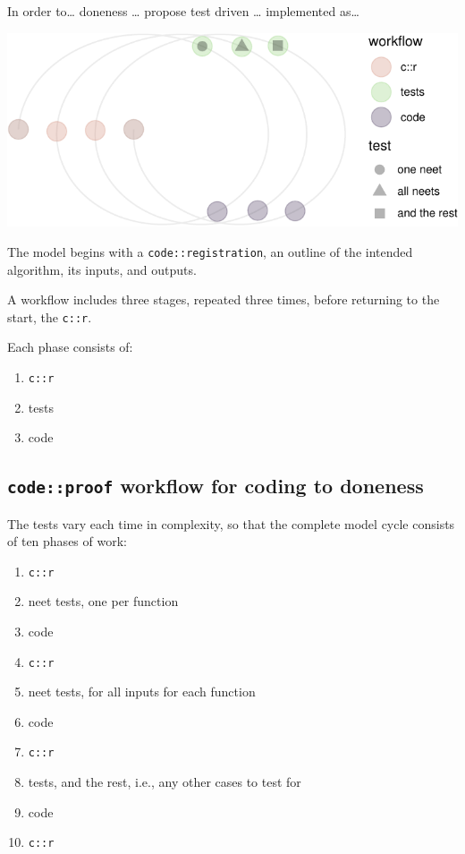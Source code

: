 \documentclass[
]{article}
\providecommand{\tightlist}{%
  \setlength{\itemsep}{0pt}\setlength{\parskip}{0pt}}
\begin{document}
In order to\ldots{} doneness \ldots{} propose test driven \ldots{} implemented as\ldots{}

\begin{center}\includegraphics{when-is-done-done_files/figure-latex/unnamed-chunk-2-1} \end{center}

The model begins with a \texttt{code::registration}, an outline of the intended algorithm, its inputs, and outputs.

A workflow includes three stages, repeated three times, before returning to the start, the \texttt{c::r}.

Each phase consists of:

\begin{enumerate}
\def\labelenumi{\arabic{enumi}.}
\tightlist
\item
  \texttt{c::r}
\item
  tests
\item
  code
\end{enumerate}

\hypertarget{codeproof-workflow-for-coding-to-doneness}{%
\subsection{\texorpdfstring{\texttt{code::proof} workflow for coding to doneness}{code::proof workflow for coding to doneness}}\label{codeproof-workflow-for-coding-to-doneness}}

The tests vary each time in complexity, so that the complete model cycle consists of ten phases of work:

\begin{enumerate}
\def\labelenumi{\arabic{enumi}.}
\tightlist
\item
  \texttt{c::r}
\item
  neet tests, one per function
\item
  code
\item
  \texttt{c::r}
\item
  neet tests, for all inputs for each function
\item
  code
\item
  \texttt{c::r}
\item
  tests, and the rest, i.e., any other cases to test for
\item
  code
\item
  \texttt{c::r}
\end{enumerate}
\end{document}
